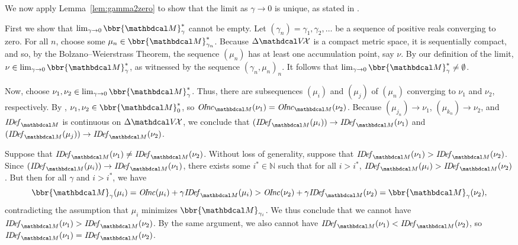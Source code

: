 \begin{subappendices}
We now apply Lemma~\ref{lem:gamma2zero} to show that the limit as
$\gamma \to 
0$ is unique, as stated in . 
\begin{lproof}\label{proof:limit-uniq}
First we show that $\lim_{\gamma \to 0}\bbr{\dg M}_\gamma^*$ cannot be empty.
Let $(\gamma_n) = \gamma_1, \gamma_2, \ldots$ be a sequence of
positive reals 
converging to zero.  For all $n$, choose some $\mu_n \in \bbr{\dg
M}_{\gamma_n}^*$. Because $\Delta\V\!\X$ is a compact metric
space, it is sequentially compact, and so, by the
Bolzano–Weierstrass Theorem, the sequence $(\mu_n)$ has at least one
accumulation point, say $\nu$. By our definition of the limit, $\nu \in
\lim_{\gamma\to0}\bbr{\dg M}_\gamma^*$, as witnessed by the sequence
$(\gamma_n, \mu_n)_n$.  It follows that $\lim_{\gamma\to0}\bbr{\dg
  M}_\gamma^* \ne \emptyset$.

Now, choose $\nu_1, \nu_2  \in  \lim_{\gamma\to0}\bbr{\dg
  M}_\gamma^*$. 
Thus, there are subsequences $(\mu_{i})$ and $(\mu_{j})$ of
$(\mu_n)$ converging
to $\nu_1$ and $\nu_2$, respectively.
By , $\nu_1, \nu_2 \in \bbr{\dg M}_0^*$, so
$\OInc_{\dg M}(\nu_1) = \OInc_{\dg M}(\nu_2)$.  
Because  $(\mu_{j_n}) \to \nu_1$, $(\mu_{k_n}) \to \nu_2$, and
$\IDef_{\dg M}$ is
continuous on $\Delta\V\!\X$,
we conclude that  
$(\IDef_{\dg M}(\mu_{i}))\to \IDef_{\dg M}(\nu_1)$ and
$(\IDef_{\dg M}(\mu_{j}))\to \IDef_{\dg M}(\nu_2)$.

Suppose that $\IDef_{\dg
M}(\nu_1) \neq \IDef_{\dg M}(\nu_2)$. Without loss of generality,
suppose that $\IDef_{\dg M}(\nu_1) > \IDef_{\dg M}(\nu_2)$. 
Since $(\IDef_{\dg M}(\mu_{i})) \to \IDef_{\dg M}(\nu_1)$, there exists some $i^*
\in \mathbb N$ such that for all $i > i^*$,  
$ \IDef_{\dg M}(\mu_{i}) >  \IDef_{\dg M}(\nu_2) $.
But then for all $\gamma$ and $i > i^*$, we have 
\[ \bbr{\dg M}_\gamma(\mu_i) = \OInc(\mu_i) + \gamma\IDef_{\dg M}(\mu_i)
> \OInc(\nu_2)  
+ \gamma \IDef_{\dg M}(\nu_2) = \bbr{\dg M}_\gamma(\nu_2),\]
contradicting the assumption that $\mu_{i}$ minimizes
$\bbr{\dg M}_{\gamma_{i}}$. We thus conclude that we
cannot have $\IDef_{\dg M}(\nu_1) > \IDef_{\dg M}(\nu_2)$.  By the same
argument, we also cannot have $\IDef_{\dg M}(\nu_1) < \IDef_{\dg
  M}(\nu_2)$, so $\IDef_{\dg M}(\nu_1) =\IDef_{\dg M}(\nu_2)$.  
  

\end{lproof}
\end{subappendices}
